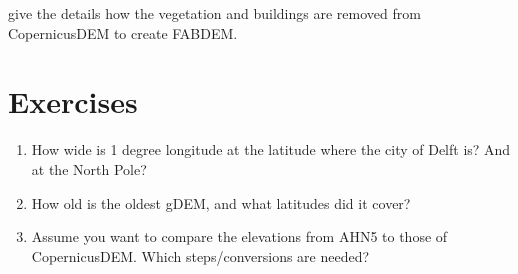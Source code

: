 \citet{Hawker22} give the details how the vegetation and buildings are removed from CopernicusDEM to create FABDEM\@.

%
\section{Exercises}

\begin{enumerate}
  \item How wide is 1 degree longitude at the latitude where the city of Delft is? And at the North Pole?
  \item How old is the oldest gDEM, and what latitudes did it cover?
  \item Assume you want to compare the elevations from AHN5 to those of CopernicusDEM\@. Which steps/conversions are needed?
\end{enumerate}
